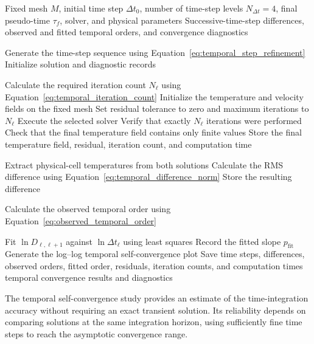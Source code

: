 \begin{algorithm}[H]
\caption{Temporal Self-Convergence Analysis}
\label{alg:temporal_self_convergence}
\begin{algorithmic}[1]
\Require Fixed mesh $M$, initial time step $\Delta t_0$,
number of time-step levels $N_{\Delta t}=4$, final
pseudo-time $\tau_f$, solver, and physical parameters
\Ensure Successive-time-step differences, observed and
fitted temporal orders, and convergence diagnostics

\State Generate the time-step sequence using
Equation~\eqref{eq:temporal_step_refinement}
\State Initialize solution and diagnostic records

    \State Calculate the required iteration count
    $N_\ell$ using Equation~\eqref{eq:temporal_iteration_count}
    \State Initialize the temperature and velocity fields
    on the fixed mesh
    \State Set residual tolerance to zero and maximum
    iterations to $N_\ell$
    \State Execute the selected solver
    \State Verify that exactly $N_\ell$ iterations were performed
    \State Check that the final temperature field contains
    only finite values
    \State Store the final temperature field, residual,
    iteration count, and computation time
\EndFor

    \State Extract physical-cell temperatures from both solutions
    \State Calculate the RMS difference using
    Equation~\eqref{eq:temporal_difference_norm}
    \State Store the resulting difference
\EndFor

    \State Calculate the observed temporal order using
    Equation~\eqref{eq:observed_temporal_order}
\EndFor

\State Fit $\ln D_{\ell,\ell+1}$ against
$\ln\Delta t_\ell$ using least squares
\State Record the fitted slope $p_{\mathrm{fit}}$
\State Generate the log--log temporal self-convergence plot
\State Save time steps, differences, observed orders,
fitted order, residuals, iteration counts, and computation times
\State \Return temporal convergence results and diagnostics
\end{algorithmic}
\end{algorithm}

The temporal self-convergence study provides an estimate of
the time-integration accuracy without requiring an exact
transient solution. Its reliability depends on comparing
solutions at the same integration horizon, using sufficiently
fine time steps to reach the asymptotic convergence range.

